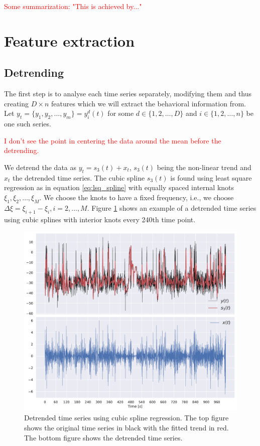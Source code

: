 \documentclass[a4paper]{memoir}
\theoremstyle{plain}
\theoremstyle{definition}
\theoremstyle{remark}
\begin{document}
\textcolor{red}{Some summarization: "This is achieved by..."}

\section{Feature extraction}
\subsection{Detrending}
The first step is to analyse each time series separately, modifying them and thus creating $D \times n$ features which we will extract the behavioral information from.
Let $y_t = \{ y_1, y_2, \hdots, y_m \} = y_i^d(t)$ for some $d \in \{ 1, 2, \hdots, D \}$ and $i \in \{ 1, 2, \hdots, n \}$ be one such series.

\textcolor{red}{I don't see the point in centering the data around the mean before the detrending.}

We detrend the data as $y_t = s_3(t) + x_t$, $s_3(t)$ being the non-linear trend and $x_t$ the detrended time series.
The cubic spline $s_3(t)$ is found using least square regression as in equation \eqref{eq:lsq_spline} with equally spaced internal knots $\xi_1, \xi_2, \hdots, \xi_M$.
We choose the knots to have a fixed frequency, i.e., we choose $\Delta \xi= \xi_{i+1} - \xi_i, i = 2, \hdots, M$.
Figure \ref{fig:detrending_bc} shows an example of a detrended time series using cubic splines with interior knots every 240th time point.


\begin{figure}[tb ]
        \centering
        \includegraphics[width=\linewidth]{./code/figures/detrending/detrending_animal_1_BackPitch.pdf}
        \caption{Detrended time series using cubic spline regression.
        The top figure shows the original time series in black with the fitted trend in red.
The bottom figure shows the detrended time series.}
        \label{fig:detrending_bc}
\end{figure}
\end{document}
